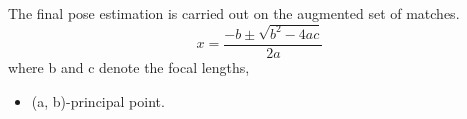 \documentclass[9pt,a4paper,twoside]{tau}
\begin{document}
The final pose estimation is carried out on the augmented set of matches.
\begin{equation} \label{eq:dis}
            x= \frac{-b \pm \sqrt{b^2 - 4ac}}{2a}
        \end{equation}
where b and c denote the focal lengths,
\begin{itemize}
        \item (a, b)-principal point.
        \end{itemize}
\end{document}
